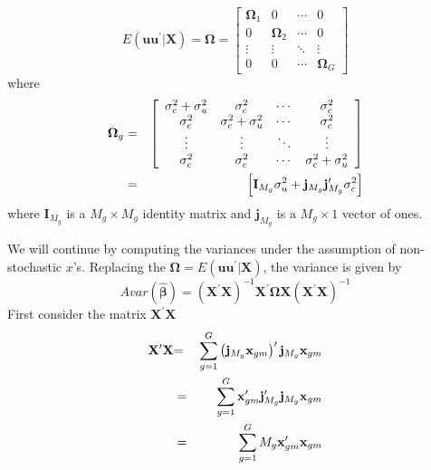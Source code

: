 \documentclass{article}
\begin{document}
\begin{equation*}
E\left( \mathbf{uu}^{\prime }|\mathbf{X}\right) =\mathbf{\Omega }=\left[ 
\begin{array}{cccc}
\mathbf{\Omega }_{1} & 0 & \cdots & 0 \\ 
0 & \mathbf{\Omega }_{2} & \cdots & 0 \\ 
\vdots & \vdots & \ddots & \vdots \\ 
0 & 0 & \cdots & \mathbf{\Omega }_{G}%
\end{array}%
\right]
\end{equation*}%
where%
\begin{eqnarray}
\mathbf{\Omega }_{g} &=&\left[ 
\begin{array}{cccc}
\sigma _{c}^{2}+\sigma _{u}^{2} & \sigma _{c}^{2} & \cdots & \sigma _{c}^{2}
\\ 
\sigma _{c}^{2} & \sigma _{c}^{2}+\sigma _{u}^{2} & \cdots & \sigma _{c}^{2}
\\ 
\vdots & \vdots & \ddots & \vdots \\ 
\sigma _{c}^{2} & \sigma _{c}^{2} & \cdots & \sigma _{c}^{2}+\sigma _{u}^{2}%
\end{array}%
\right]  \notag \\
&=&\left[ \mathbf{I}_{M_{g}}\sigma _{u}^{2}+\mathbf{j}_{M_{g}}\mathbf{j}%
_{M_{g}}^{\prime }\sigma _{c}^{2}\right]
\label{Omega cluster equicorrelated}
\end{eqnarray}%
where $\mathbf{I}_{M_{g}}$ is a $M_{g}\times M_{g}$ identity matrix and $%
\mathbf{j}_{M_{g}}$ is a $M_{g}\times 1$ vector of ones.

We will continue by computing the variances under the assumption of
non-stochastic $x$'s. Replacing the $\mathbf{\Omega }=E\left( \mathbf{uu}%
^{\prime }|\mathbf{X}\right) $, the variance is given by%
\begin{equation}
Avar\left( \mathbf{\hat{\beta}}\right) =\left( \mathbf{X}^{\prime }\mathbf{X}%
\right) ^{-1}\mathbf{X}^{\prime }\mathbf{\Omega X}\left( \mathbf{X}^{\prime }%
\mathbf{X}\right) ^{-1}  \label{variance general}
\end{equation}%
First consider the matrix $\mathbf{X}^{\prime }\mathbf{X}$%
\begin{eqnarray}
\mathbf{X}^{\prime }\mathbf{X} &\mathbf{=}&\sum_{g=1}^{G}\left( \mathbf{j}%
_{M_{g}}\mathbf{x}_{gm}\right) ^{\prime }\mathbf{j}_{M_{g}}\mathbf{x}_{gm} 
\notag \\
&=&\sum_{g=1}^{G}\mathbf{x}_{gm}^{\prime }\mathbf{j}_{M_{g}}^{\prime }%
\mathbf{j}_{M_{g}}\mathbf{x}_{gm}  \notag \\
&=&\sum_{g=1}^{G}M_{g}\mathbf{x}_{gm}^{\prime }\mathbf{x}_{gm}  \label{X'X}
\end{eqnarray}
\end{document}

